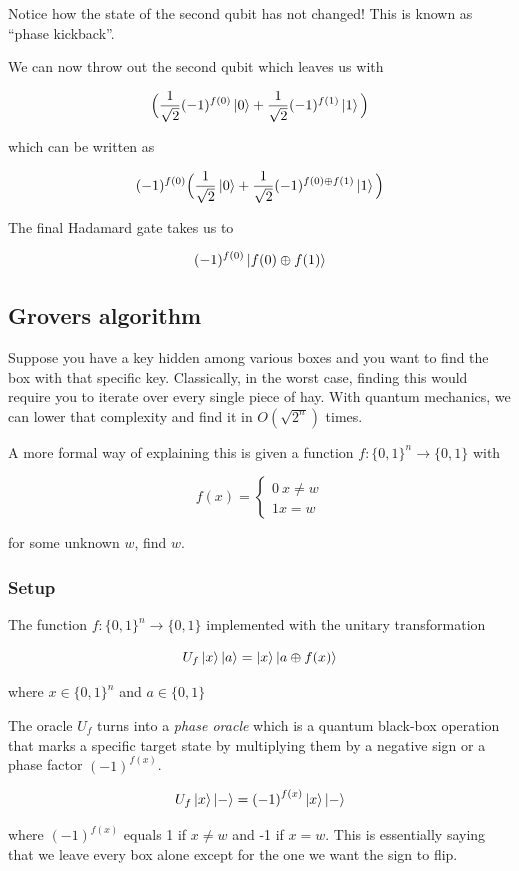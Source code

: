 \documentclass[11pt]{article}
\newcommand{\invsq}{\frac{1}{\sqrt{2}}}
\begin{document}
Notice how the state of the second qubit has not changed! This is known as ``phase kickback''.

We can now throw out the second qubit which leaves us with

\[
	\Big(\invsq(-1)^{f(0)}\ket{0} + \invsq(-1)^{f(1)}\ket{1}\Big)
\]

which can be written as

\[
	(-1)^{f(0)} \Big(\invsq\ket{0} + \invsq(-1)^{f(0) \oplus f(1)}\ket{1}\Big)
\]

The final Hadamard gate takes us to

\[
	(-1)^{f(0)}\ket{f(0) \oplus f(1)}
\]

\subsection{Grovers algorithm}

Suppose you have a key hidden among various boxes and you want to find the box with that specific key. Classically, in the worst case, finding this would require you to iterate over every single piece of hay. With quantum mechanics, we can lower that complexity and find it in $O(\sqrt{2^n})$ times.

A more formal way of explaining this is given a function $f: {\{0, 1\}}^{n} \rightarrow \{0,1\}$ with

\[
	f(x) =
	\begin{cases}
		0 \ x \ne w \\
		1 x = w
	\end{cases}
\]

for some unknown $w$, find $w$.


\subsubsection{Setup}

The function $f: \{0,1\}^n \rightarrow \{0,1\}$ implemented with the unitary transformation

\[
	U_f \ket{x}\ket{a} = \ket{x}\ket{a \oplus f(x)}
\]

where $x \in \{0,1\}^n$ and $a \in \{0,1\}$


The oracle $U_f$ turns into a \textit{phase oracle} which is a quantum black-box operation that marks a specific target state by multiplying them by a negative sign or a phase factor $(-1)^{f(x)}$.

\[
	U_f\ket{x}\ket{-} = {(-1)}^{f(x)}\ket{x}\ket{-}
\]

where ${(-1)}^{f(x)}$ equals 1 if $x \ne w$ and -1 if $x = w$. This is essentially saying that we leave every box alone except for the one we want the sign to flip.
\end{document}
